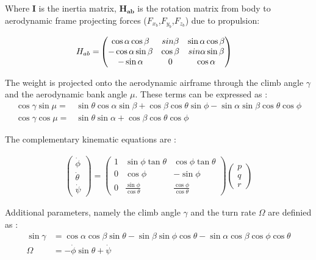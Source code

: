 Where \textbf{I} is the inertia matrix, $\mathbf{H_{ab}}$ is the rotation matrix from body to aerodynamic frame projecting forces ($F_{x_b}$,$F_{y_b}$,$F_{z_b}$) due to propulsion:

\begin{align}
H_{ab} =& 
\begin{pmatrix}
\cos\alpha \cos\beta & sin\beta & \sin\alpha \cos\beta\\
-\cos\alpha \sin\beta & \cos\beta & \-sin\alpha \sin\beta\\
-\sin\alpha & 0 & \cos\alpha 
\end{pmatrix}
\end{align}

The weight is projected onto the aerodynamic airframe through the climb angle $\gamma$ and the aerodynamic bank angle $\mu$. These terms can be expressed as \cite{Boiffier}:
\begin{align}
\cos\gamma \sin\mu =& \sin\theta \cos\alpha \sin\beta + \cos\beta\cos\theta\sin\phi - \sin\alpha\sin\beta\cos\theta\cos\phi\\
\cos\gamma \cos\mu =& \sin\theta\sin\alpha + \cos\beta\cos\theta\cos\phi
\end{align}

The complementary kinematic equations are :

\begin{align}
\begin{pmatrix}
\dot{\phi}\\
\dot{\theta}\\
\dot{\psi}
\end{pmatrix}
= \begin{pmatrix}
1 & \sin\phi \tan\theta & \cos\phi \tan\theta\\
0 & \cos\phi & -\sin \phi\\
0 &\frac{\sin\phi}{\cos\theta} & \frac{\cos \phi}{\cos \theta}
\end{pmatrix}
\begin{pmatrix}
p\\
q\\
r
\end{pmatrix} \label{E:kinematics}
\end{align}

Additional parameters, namely the climb angle $\gamma$ and the turn rate $\Omega$ are definied as :
\begin{align}
\sin \gamma &= \cos\alpha\cos\beta\sin\theta - \sin\beta\sin\phi\cos\theta - \sin\alpha\cos\beta\cos\phi\cos\theta \label{E:gammaDef}\\
\Omega &= -\dot{\phi}\sin\theta + \dot{\psi} \label{E:OmegaDef}
\end{align}


